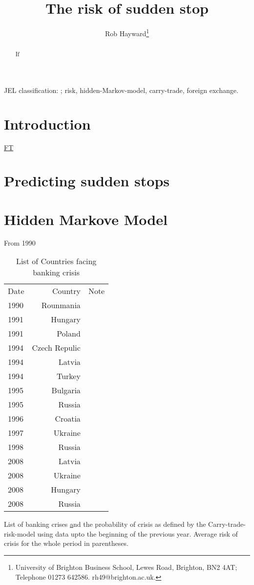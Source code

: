 \documentclass[preprint,12pt,authoryear]{elsarticle}
\begin{document}
\begin{frontmatter}
\title{The risk of sudden stop}
\author{Rob Hayward\footnote{University of Brighton Business School, Lewes Road, Brighton, BN2 4AT; Telephone 01273 642586.  rh49@brighton.ac.uk.}}

\begin{abstract}
If       
\end{abstract}
\begin{keyword}
JEL classification: ; risk, hidden-Markov-model, carry-trade, foreign exchange.
\end{keyword}

\end{frontmatter}
\section*{Introduction}
\href{https://next.ft.com/content/d73e27de-78d4-11e5-a95a-27d368e1ddf7}{FT}
\section*{Predicting sudden stops}
\section*{Hidden Markove Model}

From 1990
\begin{table}
\begin{threeparttable}
\centering
\begin{tabular}{l r r}
\hline
Date & Country & Note\\
1990 & Rounmania &\\
1991 & Hungary & \\
1991 & Poland & \\
1994 & Czech Repulic & \\
1994 & Latvia & \\
1994 & Turkey & \\
1995 & Bulgaria & \\
1995 & Russia & \\
1996 & Croatia & \\
1997 & Ukraine & \\
1998 & Russia & \\
2008 & Latvia & \\
2008 & Ukraine & \\
2008 & Hungary & \\
2008 & Russia & \\
\hline
\end{tabular}
\begin{tablenotes}
\small
\item List of banking crises \href{ReinhartRogoff} and the probability of crisis as defined by the Carry-trade-risk-model using data upto the beginning of the previous year.  Average risk of crisis for the whole period in parentheses.  
\caption{List of Countries facing banking crisis}
\end{tablenotes}
\end{threeparttable}
\label{}
\end{table}
\end{document}

